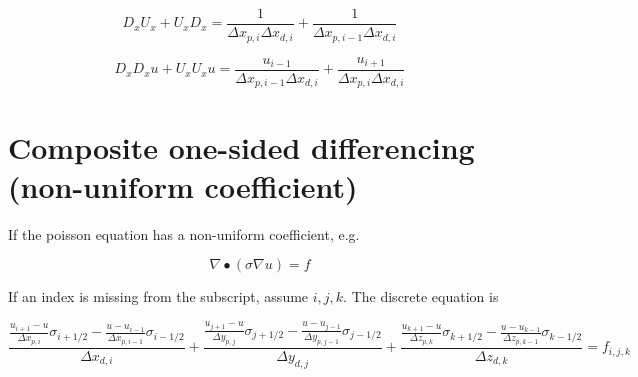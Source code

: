 \documentclass[11pt]{article}
\begin{document}
\begin{equation}
	D_x U_x +
	U_x D_x
	=
	\frac{1}{\Delta x_{p,i} \Delta x_{d,i}}
	+
	\frac{1}{\Delta x_{p,i-1} \Delta x_{d,i}}
\end{equation}

\begin{equation}
	D_x D_x u +
	U_x U_x u
	=
	\frac{u_{i-1}}{\Delta x_{p,i-1} \Delta x_{d,i}}
	+ 
	\frac{u_{i+1}}{\Delta x_{p,i} \Delta x_{d,i}} 
\end{equation}

\section{Composite one-sided differencing (non-uniform coefficient)}

If the poisson equation has a non-uniform coefficient, e.g.

\begin{equation}
	\nabla \bullet \left( \sigma \nabla u \right) = f
\end{equation}

If an index is missing from the subscript, assume $i,j,k$. The discrete equation is

\begin{equation}
	\frac{\frac{u_{i+1}-u}{\Delta x_{p,i}} \sigma_{i+1/2} - \frac{u-u_{i-1}}{\Delta x_{p,i-1}} \sigma_{i-1/2}}{\Delta x_{d,i}} + 
	\frac{\frac{u_{j+1}-u}{\Delta y_{p,j}} \sigma_{j+1/2} - \frac{u-u_{j-1}}{\Delta y_{p,j-1}} \sigma_{j-1/2}}{\Delta y_{d,j}} +
	\frac{\frac{u_{k+1}-u}{\Delta z_{p,k}} \sigma_{k+1/2} - \frac{u-u_{k-1}}{\Delta z_{p,k-1}} \sigma_{k-1/2}}{\Delta z_{d,k}} = f_{i,j,k}
\end{equation}
\end{document}
